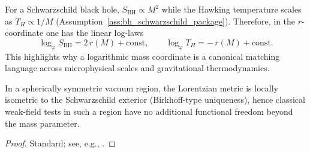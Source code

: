 \begin{remark}
For a Schwarzschild black hole, $S_{\mathrm{BH}}\propto M^2$ while the Hawking temperature scales as $T_H\propto 1/M$ \cite{Hawking1975,Wald1984} (Assumption~\ref{ass:bh_schwarzschild_package}).
Therefore, in the $r$-coordinate one has the linear log-laws
\[
\log_\varphi S_{\mathrm{BH}} = 2\,r(M) + \text{const},
\qquad
\log_\varphi T_H = -\,r(M) + \text{const}.
\]
This highlights why a logarithmic mass coordinate is a canonical matching language across microphysical scales and gravitational thermodynamics.
\end{remark}

\begin{proposition}
In a spherically symmetric vacuum region, the Lorentzian metric is locally isometric to the Schwarzschild exterior (Birkhoff-type uniqueness), hence classical weak-field tests in such a region have no additional functional freedom beyond the mass parameter.
\end{proposition}
\begin{proof}
Standard; see, e.g., \cite{Birkhoff1923,Wald1984}.
\end{proof}

